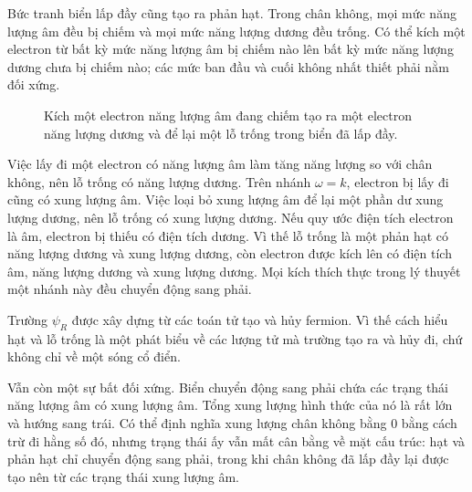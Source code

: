 Bức tranh biển lấp đầy cũng tạo ra phản hạt. Trong chân không, mọi mức năng lượng âm đều bị chiếm và mọi mức năng lượng dương đều trống. Có thể kích một electron từ bất kỳ mức năng lượng âm bị chiếm nào lên bất kỳ mức năng lượng dương chưa bị chiếm nào; các mức ban đầu và cuối không nhất thiết phải nằm đối xứng.

\begin{figure}[htbp]
\centering
{}
\caption{Kích một electron năng lượng âm đang chiếm tạo ra một electron năng lượng dương và để lại một lỗ trống trong biển đã lấp đầy.}
\end{figure}

Việc lấy đi một electron có năng lượng âm làm tăng năng lượng so với chân không, nên lỗ trống có năng lượng dương. Trên nhánh \(\omega=k\), electron bị lấy đi cũng có xung lượng âm. Việc loại bỏ xung lượng âm để lại một phần dư xung lượng dương, nên lỗ trống có xung lượng dương. Nếu quy ước điện tích electron là âm, electron bị thiếu có điện tích dương. Vì thế lỗ trống là một phản hạt có năng lượng dương và xung lượng dương, còn electron được kích lên có điện tích âm, năng lượng dương và xung lượng dương. Mọi kích thích thực trong lý thuyết một nhánh này đều chuyển động sang phải.

Trường \(\psi_R\) được xây dựng từ các toán tử tạo và hủy fermion. Vì thế cách hiểu hạt và lỗ trống là một phát biểu về các lượng tử mà trường tạo ra và hủy đi, chứ không chỉ về một sóng cổ điển.

Vẫn còn một sự bất đối xứng. Biển chuyển động sang phải chứa các trạng thái năng lượng âm có xung lượng âm. Tổng xung lượng hình thức của nó là rất lớn và hướng sang trái. Có thể định nghĩa xung lượng chân không bằng 0 bằng cách trừ đi hằng số đó, nhưng trạng thái ấy vẫn mất cân bằng về mặt cấu trúc: hạt và phản hạt chỉ chuyển động sang phải, trong khi chân không đã lấp đầy lại được tạo nên từ các trạng thái xung lượng âm.


